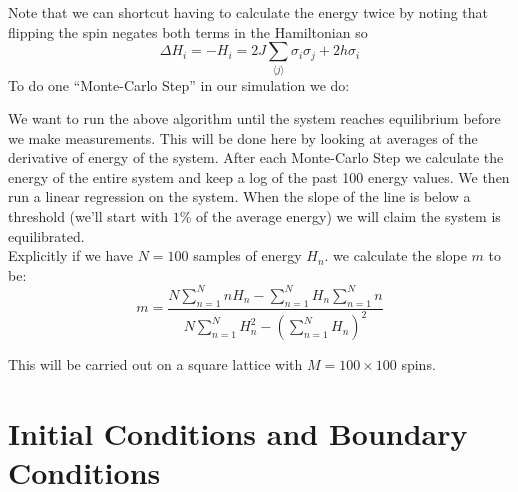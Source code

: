 \documentclass[]{scrartcl}
\begin{document}
	Note that we can shortcut having to calculate the energy twice by noting that flipping the spin negates both terms in the Hamiltonian so 
	$$\Delta H_i = -H_i = 2 J\sum_{\langle j \rangle} \sigma_i \sigma_j + 2 h \sigma_i$$
	To do one ``Monte-Carlo Step''  in our simulation we do:
	
\begin{algorithm}[H]
\end{algorithm}

	We want to run the above algorithm until the system reaches equilibrium before we make measurements. This will be done here by looking at averages of the derivative of energy of the system. After each Monte-Carlo Step  we calculate the energy of the entire system and keep a log of the past 100 energy values. We then run a linear regression on the system. When the slope of the line is below a threshold (we'll start with $1\%$ of the average energy) we will claim the system is equilibrated.\\
	
	Explicitly if we have $N=100$ samples of energy $H_n$. we calculate the slope $m$ to be:
	$$m =  \frac{N \sum_{n = 1}^N n H_n - \sum_{n = 1}^N H_n \sum_{n = 1}^N n}{N \sum_{n = 1}^N H_n^2 - (\sum_{n = 1}^N H_n)^2}$$
	
	\bigskip
	\bigskip
	This will be carried out on a square lattice with $M = 100 \times 100$ spins.
	
	
	
	\section{Initial Conditions and Boundary Conditions}
\end{document}

